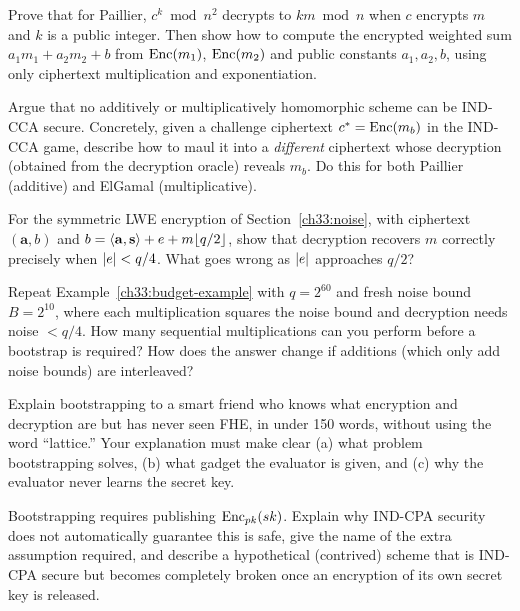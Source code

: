 \begin{exercise}
Prove that for Paillier, $c^k \bmod n^2$ decrypts to $km \bmod n$ when $c$ encrypts $m$ and $k$ is a public integer. Then show how to compute the encrypted weighted sum $a_1 m_1 + a_2 m_2 + b$ from $\operatorname{Enc}(m_1)$, $\operatorname{Enc}(m_2)$ and public constants $a_1, a_2, b$, using only ciphertext multiplication and exponentiation.
\end{exercise}

\begin{exercise}
Argue that no additively or multiplicatively homomorphic scheme can be IND-CCA secure. Concretely, given a challenge ciphertext $c^* = \operatorname{Enc}(m_b)$ in the IND-CCA game, describe how to maul it into a \emph{different} ciphertext whose decryption (obtained from the decryption oracle) reveals $m_b$. Do this for both Paillier (additive) and ElGamal (multiplicative).
\end{exercise}

\begin{exercise}
For the symmetric LWE encryption of Section~\ref{ch33:noise}, with ciphertext $(\mathbf{a}, b)$ and $b = \langle\mathbf{a},\mathbf{s}\rangle + e + m\lfloor q/2\rfloor$, show that decryption recovers $m$ correctly precisely when $\lvert e\rvert < q/4$. What goes wrong as $\lvert e\rvert$ approaches $q/2$?
\end{exercise}

\begin{exercise}
Repeat Example~\ref{ch33:budget-example} with $q = 2^{60}$ and fresh noise bound $B = 2^{10}$, where each multiplication squares the noise bound and decryption needs noise $< q/4$. How many sequential multiplications can you perform before a bootstrap is required? How does the answer change if additions (which only add noise bounds) are interleaved?
\end{exercise}

\begin{exercise}
Explain bootstrapping to a smart friend who knows what encryption and decryption are but has never seen FHE, in under 150 words, without using the word ``lattice.'' Your explanation must make clear (a) what problem bootstrapping solves, (b) what gadget the evaluator is given, and (c) why the evaluator never learns the secret key.
\end{exercise}

\begin{exercise}
Bootstrapping requires publishing $\operatorname{Enc}_{pk}(sk)$. Explain why IND-CPA security does not automatically guarantee this is safe, give the name of the extra assumption required, and describe a hypothetical (contrived) scheme that is IND-CPA secure but becomes completely broken once an encryption of its own secret key is released.
\end{exercise}

